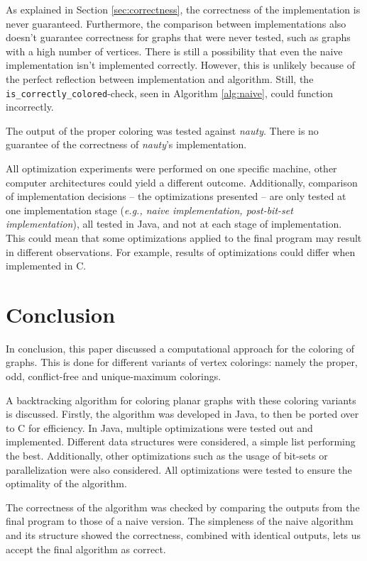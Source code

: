 \documentclass{article}
\begin{document}
As explained in Section \ref{sec:correctness}, the correctness of the implementation is never guaranteed. Furthermore, the comparison between implementations also doesn't guarantee correctness for graphs that were never tested, such as graphs with a high number of vertices. 
There is still a possibility that even the naive implementation isn't implemented correctly. However, this is unlikely because of the perfect reflection between implementation and algorithm. Still, the \texttt{is\_correctly\_colored}-check, seen in Algorithm \ref{alg:naive}, could function incorrectly.

The output of the proper coloring was tested against \textit{nauty}. There is no guarantee of the correctness of \textit{nauty}'s implementation.

All optimization experiments were performed on one specific machine, other computer architectures could yield a different outcome. 
Additionally, comparison of implementation decisions -- the optimizations presented -- are only tested at one implementation stage (\textit{e.g., naive implementation, post-bit-set implementation}), all tested in Java, and not at each stage of implementation. This could mean that some optimizations applied to the final program may result in different observations. For example, results of optimizations could differ when implemented in C.

\section{Conclusion}
\label{sec:conclusion}

In conclusion, this paper discussed a computational approach for the coloring of graphs. This is done for different variants of vertex colorings: namely the proper, odd, conflict-free and unique-maximum colorings. 

A backtracking algorithm for coloring planar graphs with these coloring variants is discussed. Firstly, the algorithm was developed in Java, to then be ported over to C for efficiency. In Java, multiple optimizations were tested out and implemented. Different data structures were considered, a simple list performing the best. Additionally, other optimizations such as the usage of bit-sets or parallelization were also considered. 
All optimizations were tested to ensure the optimality of the algorithm.

The correctness of the algorithm was checked by comparing the outputs from the final program to those of a naive version. The simpleness of the naive algorithm and its structure showed the correctness, combined with identical outputs, lets us accept the final algorithm as correct.
\end{document}
